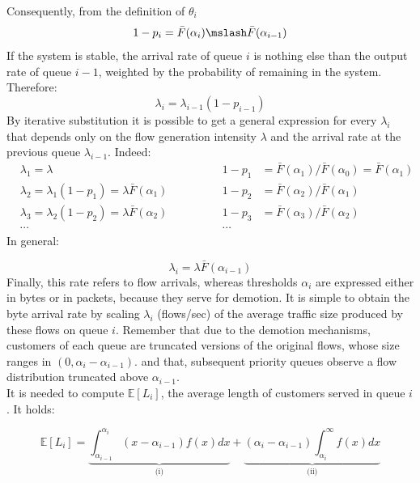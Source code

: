 Consequently, from the definition of $\theta_i$
\[ 	
1-p_i = \bar{F}(\alpha_{i}) \mslash \bar{F}(\alpha_{i-1}) 
\]
If the system is stable, the arrival rate of queue $i$ is nothing else than the output rate
of queue $i-1$, weighted by the probability of remaining in the system. 
Therefore:
\[
\lambda_i = \lambda_{i-1} (1-p_{i-1})
\]
By iterative substitution it is possible to get a general expression for every $\lambda_i$ that depends only on the flow generation intensity $\lambda$ and the arrival rate at the previous queue $\lambda_{i-1}$. Indeed:
\begin{align*}
&\lambda_1 = \lambda \qquad \qquad & 1-p_1 &= \bar{F}(\alpha_1) / \bar{F}(\alpha_0) = \bar{F}(\alpha_1) \\
&\lambda_2 =  \lambda_1 (1-p_1) = \lambda \bar{F}(\alpha_1)  \qquad \qquad & 1-p_2 &= \bar{F}(\alpha_2) / \bar{F}(\alpha_1) \\
&\lambda_3 =  \lambda_2 (1-p_2) = \lambda \bar{F}(\alpha_2)  \qquad \qquad & 1-p_3 &= \bar{F}(\alpha_3) / \bar{F}(\alpha_2) \\
& \cdots \qquad \qquad & \cdots &
\end{align*}
In general:

\[
	\lambda_{i} = \lambda \bar{F}(\alpha_{i-1})
\]
Finally, this rate refers to flow arrivals, whereas thresholds $\alpha_i$ are expressed either in bytes or in packets, because they serve for demotion. It is simple to obtain the byte arrival rate by scaling $\lambda_i$ (flows/sec) of the average traffic size produced by these flows on queue $i$. Remember that due to the demotion mechanisms, customers of each queue are truncated versions of the original flows, whose size ranges in $(0, \alpha_{i}-\alpha_{i-1})$. and that, subsequent priority queues observe a flow distribution truncated above $\alpha_{i-1}$. \\
It is needed to compute $\mathbb{E}[L_i]$, the average length of customers served in queue $i$. It holds:

\begin{equation}
\label{load-on-pqi}
\mathbb{E}[L_i]=
\underbrace{\int_{\alpha_{i-1}}^{\alpha_i}(x-\alpha_{i-1})f(x)dx}_{\text{(i)}} +
\underbrace{(\alpha_{i}-\alpha_{i-1})\int_{\alpha_i}^{\infty}f(x)dx}_{\text{(ii)}}
\end{equation}

